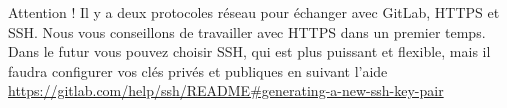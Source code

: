\documentclass[final, a4paper, openbib, ]{article}
\begin{document}

\begin{alertinfo2}{Attention !}
Il y a deux protocoles réseau pour échanger avec GitLab, HTTPS et SSH. Nous vous conseillons de travailler avec HTTPS dans un premier temps.
Dans le futur vous pouvez choisir SSH, qui est plus puissant et flexible, mais il faudra configurer vos clés privés et publiques en suivant l'aide \url{https://gitlab.com/help/ssh/README\#generating-a-new-ssh-key-pair}
\end{alertinfo2}
\end{document}

